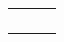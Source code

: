 \begin{table}[H]
\begin{tabular}{|l|l|l|}
                                                                                                            &                                    &                                                                                                                                                                    \\ \hline
                                                                                                            &                                    &                                                                                                                                                                    \\ \hline
                                                                                                            &                                    &                                                                                                                                                                    \\ \hline
                                                                                                            &                                    &                                                                                                                                                                    \\ \hline
                                                                                                            &                                    &                                                                                                                                                                    \\ \hline
\end{tabular}
\end{table}
